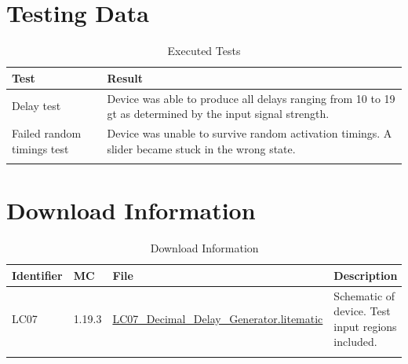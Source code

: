 \documentclass[10pt]{datasheet}
\begin{document}
\section{Testing Data}
\begin{table}[h]
\caption{Executed Tests}
\begin{tabularx}{\textwidth}{l | X}
    \thickhline
    \textbf{Test} & \textbf{Result} \\
    \hline
    Delay test & Device was able to produce all delays ranging from 10 to 19 gt as determined by the input signal strength.\\
    \hline
    Failed random timings test & Device was unable to survive random activation timings. A slider became stuck in the wrong state.\\
    \thickhline
\end{tabularx}
\end{table}

\section{Download Information}
\begin{table}[h]
    \caption{Download Information}
    \begin{tabularx}{\textwidth}{l | l | l | X}
        \thickhline
        \textbf{Identifier} & \textbf{MC} & \textbf{File} & \textbf{Description} \\
        \hline
        LC07 & 1.19.3 & \href{https://github.com/Soontech-Annals/Archive/blob/63c9ea8c34519ca4eb58649773e0c37e7e462fdd/Archive/logic-and-computation/LC07\%20Decimal\%20Delay\%20Generator/LC07\_Decimal\_Delay\_Generator.litematic?raw=1}{LC07\_Decimal\_Delay\_Generator.litematic} & Schematic of device. Test input regions included. \\
        \hline
        \thickhline
    \end{tabularx}
\end{table}
\end{document}
